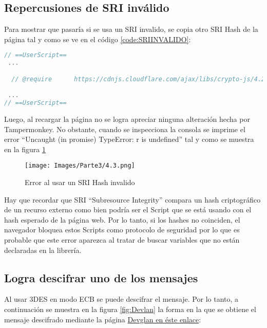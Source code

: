 \documentclass[letter,12pt]{article}
\newcounter{codecount}
\begin{document}
\subsection{Repercusiones de SRI inválido}

Para mostrar que pasaría si se usa un SRI invalido, se copia otro SRI Hash de la página tal y como se ve en el código \ref{code:SRIINVALIDO}:

\label{code:SRIINVALIDO}
\begin{lstlisting}[language=JavaScript, caption={Uso de SRI en la librería CryptoJS}]
// ==UserScript==
 ...

  // @require      https://cdnjs.cloudflare.com/ajax/libs/crypto-js/4.2.0/aes.min.js#sha512-UOtWWEXoMk1WLeC873Gmrkb2/dZMwvN1ViM9C1mNvNmQSeXpEr8sRzXLmUSha1X4x5V892uFmEjiZzUsYiHYiw==

 ...
// ==UserScript==


\end{lstlisting}

\clearpage

Luego, al recargar la página no se logra apreciar ninguna alteración hecha por Tampermonkey. No obstante, cuando se inspecciona la consola se imprime el error ``Uncaught (in promise) TypeError: r is undefined'' tal y como se muestra en la figura \ref{fig:SRIINVALDO_}

\begin{figure}[H]
    \centering
    \texttt{[image: Images/Parte3/4.3.png]}
    \caption{Error al usar un SRI Hash invalido}
    \label{fig:SRIINVALDO_}
\end{figure}

Hay que recordar que SRI ``Subresource Integrity'' compara un hash criptográfico de un recurso externo como bien podría ser el Script que se está usando con el hash esperado de la página web. Por lo tanto, si los hashes no coinciden, el navegador bloquea estos Scripts como protocolo de seguridad por lo que es probable que este error aparezca al tratar de buscar variables que no están declaradas en la librería.

\clearpage

\subsection{Logra descifrar uno de los mensajes}

Al usar 3DES en modo ECB se puede descifrar el mensaje. Por lo tanto, a continuación se muestra en la figura \ref{fig:Devlan} la forma en la que se obtiene el mensaje descifrado mediante la página \href{https://www.devglan.com/online-tools/triple-des-encrypt-decrypt}{Devglan en éste enlace}:
\end{document}
